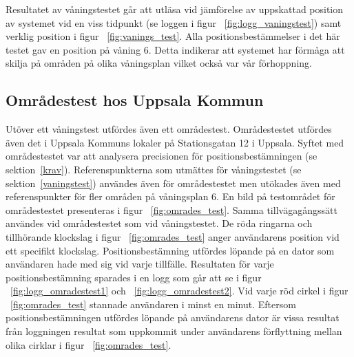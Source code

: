 \documentclass[a4paper,12pt]{article}
\begin{document}
 Resultatet av våningstestet går att utläsa vid jämförelse av uppskattad position av systemet vid en viss tidpunkt (se loggen i figur ~\ref{fig:logg_vaningstest}) samt verklig position i figur ~\ref{fig:vanings_test}. Alla positionsbestämmelser i det här testet gav en position på våning 6. Detta indikerar att systemet har förmåga att skilja på områden på olika våningsplan vilket också var vår förhoppning.

 \subsection{Områdestest hos Uppsala Kommun}
 Utöver ett våningstest utfördes även ett områdestest. Områdestestet utfördes även det i Uppsala Kommuns lokaler på Stationsgatan 12 i Uppsala. Syftet med områdestestet var att analysera precisionen för positionsbestämningen (se sektion~\ref{krav}). Referenspunkterna som utmättes för våningstestet (se sektion~\ref{vaningstest}) användes även för områdestestet men utökades även med referenspunkter för fler områden på våningsplan 6. En bild på testområdet för områdestestet presenteras i figur ~\ref{fig:omrades_test}. Samma tillvägagångssätt användes vid områdestestet som vid våningstestet. De röda ringarna och tillhörande klockslag i figur ~\ref{fig:omrades_test} anger användarens position vid ett specifikt klockslag. Positionsbestämning utfördes löpande på en dator som användaren hade med sig vid varje tillfälle. Resultaten för varje positionsbestämning sparades i en logg som går att se i figur ~\ref{fig:logg_omradestest1} och ~\ref{fig:logg_omradestest2}. Vid varje röd cirkel i figur ~\ref{fig:omrades_test} stannade användaren i minst en minut. Eftersom positionsbestämningen utfördes löpande på användarens dator är vissa resultat från loggningen resultat som uppkommit under användarens förflyttning mellan olika cirklar i figur ~\ref{fig:omrades_test}.
\end{document}
